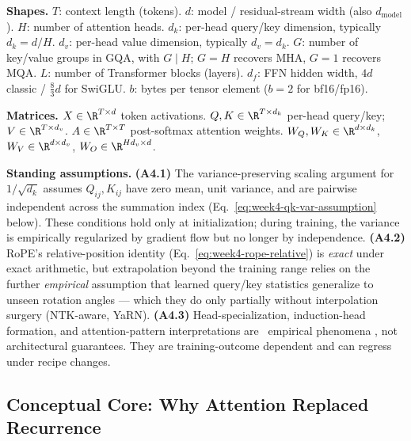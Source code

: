 \begin{notationbox}
\textbf{Shapes.}
$T$: context length (tokens). $d$: model / residual-stream width
(also $d_{\mathrm{model}}$). $H$: number of attention heads.
$d_k$: per-head query/key dimension, typically $d_k = d/H$.
$d_v$: per-head value dimension, typically $d_v = d_k$.
$G$: number of key/value groups in GQA, with $G \mid H$; $G = H$
recovers MHA, $G = 1$ recovers MQA.
$L$: number of Transformer blocks (layers).
$d_f$: FFN hidden width, $4d$ classic / $\tfrac{8}{3}d$ for SwiGLU.
$b$: bytes per tensor element ($b{=}2$ for bf16/fp16).

\textbf{Matrices.}
$X \in \R^{T\times d}$ token activations. $Q,K \in \R^{T\times d_k}$
per-head query/key; $V \in \R^{T\times d_v}$. $A \in \R^{T\times T}$
post-softmax attention weights. $W_Q, W_K \in \R^{d\times d_k}$,
$W_V \in \R^{d\times d_v}$, $W_O \in \R^{H d_v \times d}$.

\textbf{Standing assumptions.}
\textbf{(A4.1)} The variance-preserving scaling argument for
$1/\sqrt{d_k}$ assumes $Q_{ij}, K_{ij}$ have zero mean, unit
variance, and are pairwise independent across the summation index
(Eq.~\eqref{eq:week4-qk-var-assumption} below). These conditions
hold only at initialization; during training, the variance is
empirically regularized by gradient flow but no longer by
independence.
\textbf{(A4.2)} RoPE's relative-position identity
(Eq.~\eqref{eq:week4-rope-relative}) is \emph{exact} under exact
arithmetic, but extrapolation beyond the training range relies on
the further \emph{empirical} assumption that learned query/key
statistics generalize to unseen rotation angles --- which they do
only partially without interpolation surgery (NTK-aware, YaRN).
\textbf{(A4.3)} Head-specialization, induction-head formation, and
attention-pattern interpretations are \Emp\ empirical phenomena
\citep{elhage2021mathematical, olsson2022induction}, not
architectural guarantees. They are training-outcome dependent and
can regress under recipe changes.
\end{notationbox}

\subsection{Conceptual Core: Why Attention Replaced Recurrence}

